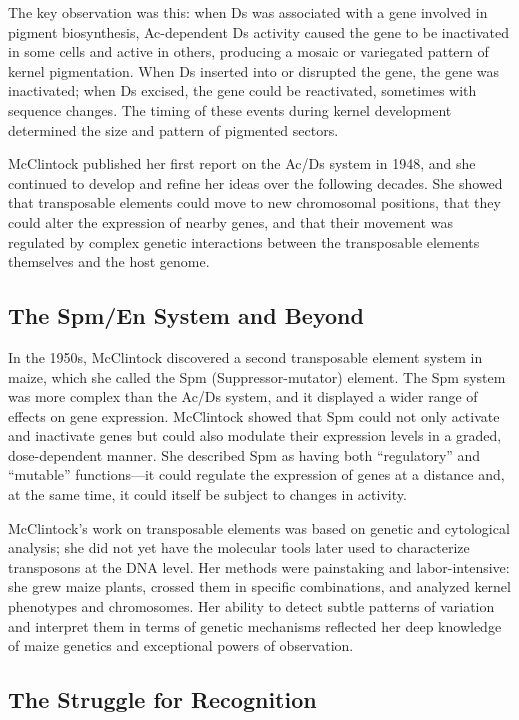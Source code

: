 The key observation was this: when Ds was associated with a gene involved in pigment biosynthesis, Ac-dependent Ds activity caused the gene to be inactivated in some cells and active in others, producing a mosaic or variegated pattern of kernel pigmentation. When Ds inserted into or disrupted the gene, the gene was inactivated; when Ds excised, the gene could be reactivated, sometimes with sequence changes. The timing of these events during kernel development determined the size and pattern of pigmented sectors.

McClintock published her first report on the Ac/Ds system in 1948, and she continued to develop and refine her ideas over the following decades. She showed that transposable elements could move to new chromosomal positions, that they could alter the expression of nearby genes, and that their movement was regulated by complex genetic interactions between the transposable elements themselves and the host genome.

\subsection{The Spm/En System and Beyond}

In the 1950s, McClintock discovered a second transposable element system in maize, which she called the Spm (Suppressor-mutator) element. The Spm system was more complex than the Ac/Ds system, and it displayed a wider range of effects on gene expression. McClintock showed that Spm could not only activate and inactivate genes but could also modulate their expression levels in a graded, dose-dependent manner. She described Spm as having both ``regulatory'' and ``mutable'' functions---it could regulate the expression of genes at a distance and, at the same time, it could itself be subject to changes in activity.

McClintock's work on transposable elements was based on genetic and cytological analysis; she did not yet have the molecular tools later used to characterize transposons at the DNA level. Her methods were painstaking and labor-intensive: she grew maize plants, crossed them in specific combinations, and analyzed kernel phenotypes and chromosomes. Her ability to detect subtle patterns of variation and interpret them in terms of genetic mechanisms reflected her deep knowledge of maize genetics and exceptional powers of observation.

\subsection{The Struggle for Recognition}

